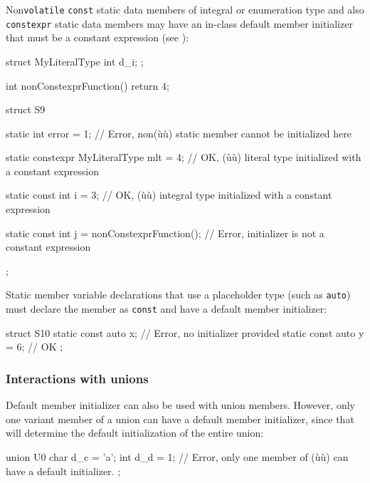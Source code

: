 Non\lstinline!volatile! \lstinline!const! static data members of integral or
enumeration type and also \lstinline!constexpr! static data members may
have an in-class default member initializer that must be a constant
expression (see ):

\begin{emcppslisting}
struct MyLiteralType { int d_i; };

int nonConstexprFunction() { return 4; }

struct S9
{
    static int error = 1;
        // Error, non(ù{}ù) static member cannot be initialized here

    static constexpr MyLiteralType mlt = {4};
        // OK, (ù{}ù) literal type initialized with a constant expression

    static const int i = 3;
        // OK, (ù{}ù) integral type initialized with a constant expression

    static const int j = nonConstexprFunction();
        // Error, initializer is not a constant expression
};
\end{emcppslisting}
    

Static member variable declarations that use a placeholder type (such as
\lstinline!auto!) must declare the member as \lstinline!const! and have a
default member initializer:

\begin{emcppslisting}
struct S10
{
    static const auto x;     // Error, no initializer provided
    static const auto y = 6; // OK
};
\end{emcppslisting}
    

\subsubsection[Interactions with unions]{Interactions with unions}\label{interactions-with-unions}

Default member initializer can also be used with union members. However,
only one variant member of a union can have a default member
initializer, since that will determine the default initialization of the
entire union:

\begin{emcppslisting}
union U0
{
    char d_c = 'a';
    int  d_d = 1;
        // Error, only one member of (ù{}ù) can have a default initializer.
};
\end{emcppslisting}
    

